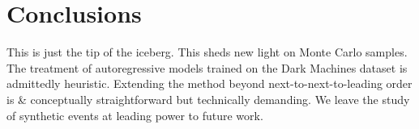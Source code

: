 \section{Conclusions}\label{sec:conclusions}

This is just the tip of the iceberg. This sheds new light on Monte Carlo
samples. The treatment of autoregressive models trained on the Dark
Machines dataset is admittedly heuristic. Extending the method beyond
next-to-next-to-leading order is & conceptually straightforward but
technically demanding. We leave the study of synthetic events at leading
power to future work.

